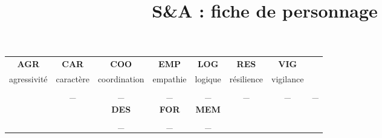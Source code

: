 \documentclass[10pt,a4paper]{article}
\author{}
\title{S\&A : fiche de personnage}
\date{}
\begin{document}
\centering
\begin{tabular}{ccccccc}

\textbf{AGR} & \textbf{CAR} & \textbf{COO} & \textbf{EMP} & \textbf{LOG} &  \textbf{RES} & \textbf{VIG}\\
\small
agressivité & \small caractère &\small coordination &\small empathie &\small logique &\small résilience &\small vigilance \\
& \_ &\_ &\_ &\_ &\_ &\_ &\_ \\
  &  & \textbf{DES}& \textbf{FOR}& \textbf{MEM}\\
  & & \_ &\_ &\_ & &\\
\end{tabular}
\end{document}
